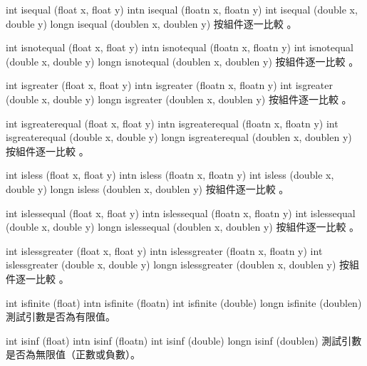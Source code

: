 int isequal (float x, float y)
intn isequal (floatn x, floatn y) 
int isequal (double x, double y)
longn isequal (doublen x, doublen y)
\stopbuffer
{}
按組件逐一比較 。
\stopbuffer

int isnotequal (float x, float y)
intn isnotequal (floatn x, floatn y)
int isnotequal (double x, double y)
longn isnotequal (doublen x, doublen y)
\stopbuffer
{}
按組件逐一比較 。
\stopbuffer

int isgreater (float x, float y)
intn isgreater (floatn x, floatn y)
int isgreater (double x, double y)
longn isgreater (doublen x, doublen y)
\stopbuffer
{}
按組件逐一比較 。
\stopbuffer

int isgreaterequal (float x, float y)
intn isgreaterequal (floatn x, floatn y)
int isgreaterequal (double x,
		double y)
longn isgreaterequal (doublen x,
		doublen y)
\stopbuffer
{}
按組件逐一比較 。
\stopbuffer

int isless (float x, float y)
intn isless (floatn x, floatn y)
int isless (double x, double y)
longn isless (doublen x, doublen y)
\stopbuffer
{}
按組件逐一比較 。
\stopbuffer

int islessequal (float x, float y)
intn islessequal (floatn x, floatn y)
int islessequal (double x, double y)
longn islessequal (doublen x, doublen y)
\stopbuffer
{}
按組件逐一比較 。
\stopbuffer

int islessgreater (float x, float y)
intn islessgreater (floatn x, floatn y)
int islessgreater (double x, double y)
longn islessgreater (doublen x, doublen y)
\stopbuffer
{}
按組件逐一比較 。
\stopbuffer

int isfinite (float)
intn isfinite (floatn)
int isfinite (double)
longn isfinite (doublen)
\stopbuffer
{}
測試引數是否為有限值。
\stopbuffer

int isinf (float)
intn isinf (floatn)
int isinf (double)
longn isinf (doublen)
\stopbuffer
{}
測試引數是否為無限值（正數或負數）。
\stopbuffer

